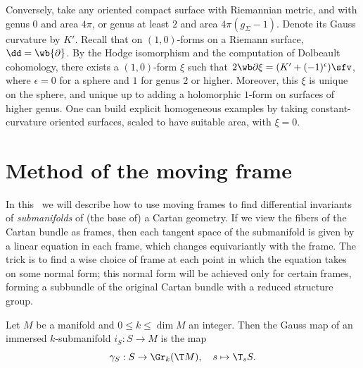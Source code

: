 Conversely, take any oriented compact surface with Riemannian metric, and with genus $0$ and area $4\pi$, or genus at least $2$ and area $4\pi (g_\varSigma-1)$. Denote its Gauss curvature by $K'$. Recall that on $(1,0)$-forms on a Riemann surface, $\dd=\wb{\partial}$. By the Hodge isomorphism and the computation of Dolbeault cohomology, there exists a $(1,0)$-form $\xi$ such that $2\wb\partial\xi=(K'+(-1)^\epsilon)\sfv$, where $\epsilon=0$ for a sphere and $1$ for genus $2$ or higher. Moreover, this $\xi$ is unique on the sphere, and unique up to adding a holomorphic $1$-form on surfaces of higher genus. One can build explicit homogeneous examples by taking constant-curvature oriented surfaces, scaled to have suitable area, with $\xi=0$.



\section{Method of the moving frame}


In this \sect\ we will describe how to use moving frames to find differential invariants of \emph{submanifolds} of (the base of) a Cartan geometry. If we view the fibers of the Cartan bundle as frames, then each tangent space of the submanifold is given by a linear equation in each frame, which changes equivariantly with the frame. The trick is to find a wise choice of frame at each point in which the equation takes on some normal form; this normal form will be achieved only for certain frames, forming a subbundle of the original Cartan bundle with a reduced structure group.

\begin{defn}
    Let $M$ be a manifold and $0\leq k\leq \dim M$ an integer. Then the Gauss map of an immersed $k$-submanifold $i_S:S\to M$ is the map 
    \[\gamma_S:S\to \Gr_k (\T M),\quad s\mapsto \T_s S.\]
\end{defn}

